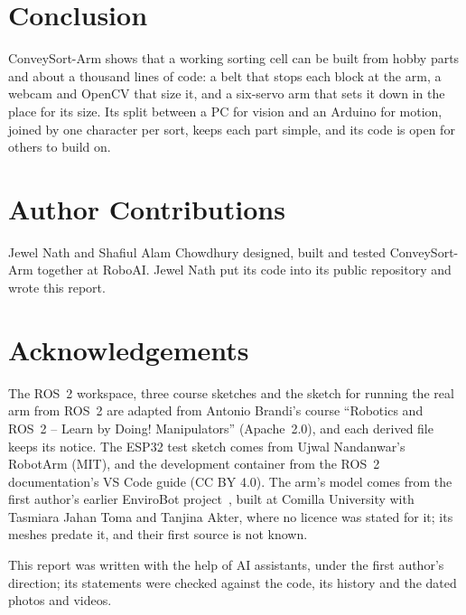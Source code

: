 \documentclass[11pt]{article}
\begin{document}
\section{Conclusion}

ConveySort-Arm shows that a working sorting cell can be built from hobby parts and about a thousand lines of code: a belt that stops each block at the arm, a webcam and OpenCV that size it, and a six-servo arm that sets it down in the place for its size. Its split between a PC for vision and an Arduino for motion, joined by one character per sort, keeps each part simple, and its code is open for others to build on.

\section*{Author Contributions}

Jewel Nath and Shafiul Alam Chowdhury designed, built and tested ConveySort-Arm together at RoboAI. Jewel Nath put its code into its public repository and wrote this report.

\section*{Acknowledgements}

The ROS~2 workspace, three course sketches and the sketch for running the real arm from ROS~2 are adapted from Antonio Brandi's course ``Robotics and ROS~2 -- Learn by Doing! Manipulators'' (Apache~2.0), and each derived file keeps its notice. The ESP32 test sketch comes from Ujwal Nandanwar's RobotArm (MIT), and the development container from the ROS~2 documentation's VS Code guide (CC BY 4.0). The arm's model comes from the first author's earlier EnviroBot project~\cite{envirobot2026}, built at Comilla University with Tasmiara Jahan Toma and Tanjina Akter, where no licence was stated for it; its meshes predate it, and their first source is not known.

This report was written with the help of AI assistants, under the first author's direction; its statements were checked against the code, its history and the dated photos and videos.

{\small


}
\end{document}
